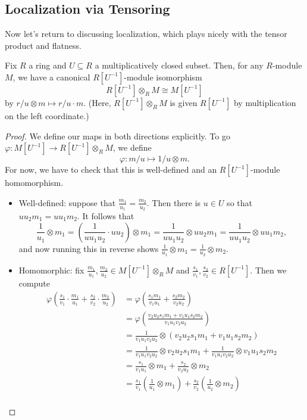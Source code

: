 \subsection{Localization via Tensoring}
Now let's return to discussing localization, which plays nicely with the tensor product and flatness.
\begin{proposition} \label{prop:localizeistensor}
	Fix $R$ a ring and $U\subseteq R$ a multiplicatively closed subset. Then, for any $R$-module $M$, we have a canonical $R\left[U^{-1}\right]$-module isomorphism
	\[R\left[U^{-1}\right]\otimes_RM\cong M\left[U^{-1}\right]\]
	by $r/u\otimes m\mapsto r/u\cdot m$. (Here, $R\left[U^{-1}\right]\otimes_RM$ is given $R\left[U^{-1}\right]$ by multiplication on the left coordinate.)
\end{proposition}
\begin{proof}
	We define our maps in both directions explicitly. To go $\varphi:M\left[U^{-1}\right]\to R\left[U^{-1}\right]\otimes_RM$, we define
	\[\boxed{\varphi:m/u\mapsto1/u\otimes m}.\]
	For now, we have to check that this is well-defined and an $R\left[U^{-1}\right]$-module homomorphism.
	\begin{itemize}
		\item Well-defined: suppose that $\frac{m_1}{u_1}=\frac{m_2}{u_2}$. Then there is $u\in U$ so that $uu_2m_1=uu_1m_2$. It follows that
		\[\frac1{u_1}\otimes m_1=\left(\frac1{uu_1u_2}\cdot uu_2\right)\otimes m_1=\frac1{uu_1u_2}\otimes uu_2m_1=\frac1{uu_1u_2}\otimes uu_1m_2,\]
		and now running this in reverse shows $\frac1{u_1}\otimes m_1=\frac1{u_2}\otimes m_2$.
		\item Homomorphic: fix $\frac{m_1}{u_1},\frac{m_2}{u_2}\in M\left[U^{-1}\right]\otimes_RM$ and $\frac{s_1}{v_1},\frac{s_2}{v_2}\in R\left[U^{-1}\right]$. Then we compute
		\begin{align*}
			\varphi\left(\frac{s_1}{v_1}\cdot\frac{m_1}{u_1}+\frac{s_2}{v_2}\cdot\frac{m_2}{u_2}\right) &= \varphi\left(\frac{s_1m_1}{v_1u_1}+\frac{s_2m_2}{v_2u_2}\right) \\
			&= \varphi\left(\frac{v_2u_2s_1m_1+v_1u_1s_2m_2}{v_1u_1v_2u_2}\right) \\
			&= \frac1{v_1u_1v_2u_2}\otimes(v_2u_2s_1m_1+v_1u_1s_2m_2) \\
			&= \frac1{v_1u_1v_2u_2}\otimes v_2u_2s_1m_1+\frac1{v_1u_1v_2u_2}\otimes v_1u_1s_2m_2 \\
			&= \frac{s_1}{v_1u_1}\otimes m_1+\frac{s_2}{v_2u_2}\otimes m_2 \\
			&= \frac{s_1}{v_1}\left(\frac1{u_1}\otimes m_1\right)+\frac{s_2}{v_2}\left(\frac1{u_2}\otimes m_2\right) \\

\end{align*}
\end{itemize}
\end{proof}
